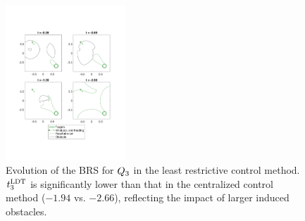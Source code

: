 \begin{figure}[h]
  \vspace{-1em}
  \centering
  \includegraphics[width=0.40\textwidth]{"fig/lrc_rs3"}
  \caption{Evolution of the BRS for $Q_3$ in the least restrictive control method. $t^\text{LDT}_3$ is significantly lower than that in the centralized control method ($-1.94$ vs. $-2.66$), reflecting the impact of larger induced obstacles.}
  \label{fig:lrc_rs3}
  \vspace{-1.5em}
\end{figure}
